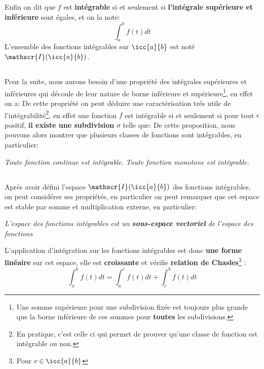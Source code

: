 Enfin on dit que \(f\) est \textbf{intégrable} si et seulement si \textbf{l'intégrale supérieure et inférieure} sont égales, et on la note:
\[
   \int_{a}^{b} f(t) d t  
\]
L'ensemble des fonctions intégrables sur \(\icc{a}{b}\) est noté \(\mathscr{I}(\icc{a}{b})\).
\pagebreak

\subsection*{}

Pour la suite, nous aurons besoin d'une propriété des intégrales supérieures et inférieures qui découle de leur nature de borne inférieure et supérieure\footnote[1]{Une somme supérieure pour une subdivision fixée est toujours plus grande que la borne inférieure de ces sommes pour \textbf{toutes} les subdivisions.}, en effet on a:
De cette propriété on peut déduire une caractérisation trés utile de l'intégrabilité\footnote[2]{En pratique, c'est celle ci qui permet de prouver qu'une classe de fonction est intégrable ou non.}, en effet une fonction \(f\) est intégrable si et seulement si pour tout \(\epsilon\) positif, \textbf{il existe une subdivision} \(\sigma\) telle que:
De cette proposition, nous pouvons alors montrer que plusieurs classes de fonctions sont intégrables, en particulier:
\begin{center}
   \textit{Toute fonction continue est intégrable.}\+
   \textit{Toute fonction monotone est intégrable. }
\end{center}

\subsection*{}

Aprés avoir défini l'espace \(\mathscr{I}(\icc{a}{b})\) des fonctions intégrables, on peut considérer ses propriétés, en particulier on peut remarquer que cet espace est stable par somme et multiplication externe, en particulier:
\begin{center}
   \textit{L'espace des fonctions intégrables est un \textbf{sous-espace vectoriel} de l'espace des fonctions}
\end{center}
L'application d'intégration sur les fonctions intégrables est donc \textbf{une forme linéaire} sur cet espace, elle est \textbf{croissante} et vérifie \textbf{relation de Chasles}\footnote[3]{Pour \(c \in \icc{a}{b}\)} :
\[
   \int_{a}^{b} f(t) d t = \int_{a}^{c} f(t) d t + \int_{c}^{b} f(t) d t
\]
  

